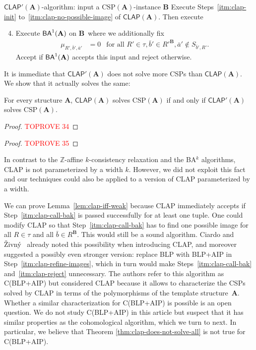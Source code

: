 \documentclass[a4paper,english, thm-restate]{lipics-v2021}
\newcommand{\ZZ}{\mathbb{Z}}
\newcommand{\tup}[1]{\bar{#1}}
\newcommand{\sig}{\tau}
\newcommand{\StructA}{\mathbf{A}}
\newcommand{\StructB}{\mathbf{B}}
\newcommand{\CSP}[1]{\mathrm{CSP}(#1)}
\newcommand{\CLAP}[1]{\mathsf{CLAP}(#1)}
\newcommand{\CLAPw}[1]{\mathsf{CLAP'}(#1)}
\begin{document}
	\begin{algobox}[top=0.4em]{$\CLAPw{\StructA}$-algorithm: input a $\CSP{\StructA}$-instance $\StructB$}
		Execute Steps~\ref{itm:clap-init} to~\ref{itm:clap-no-possible-image} of $\CLAP{\StructA}$. Then execute
		\begin{enumerate}[label=\arabic*$'$.,ref=\arabic*$'$]
			\setcounter{enumi}{3}
			\item Execute $\BAk{1}{\StructA}$ on $\StructB$\, where we additionally fix
			\begin{align*}
				\mu_{R',\tup{b}',\tup{a}'}& = 0 &\text{for all } R' \in \sig, \tup{b}' \in R'^\StructB, \tup{a}' \not\in S_{\tup{b}',R'}.
			\end{align*}
			Accept if $\BAk{1}{\StructA}$ accepts this input and reject otherwise.\label{itm:clap'-call-bak}
		\end{enumerate}
	\end{algobox}
	\noindent It is immediate that $\CLAPw{\StructA}$ does not solve more CSPs than $\CLAP{\StructA}$.
	We show that it actually solves the same:
	
	\begin{lemma}
		\label{lem:clap-iff-weak}
		For every structure $\StructA$,
		$\CLAP{\StructA}$ solves $\CSP{\StructA}$ if and only if $\CLAPw{\StructA}$ solves $\CSP{\StructA}$.
	\end{lemma}
	\begin{proof}\textcolor{red}{TOPROVE 34}\end{proof}
	
	\clapDoesNotSolveAll*
	\begin{proof}\textcolor{red}{TOPROVE 35}\end{proof}	
	
	\noindent In contrast to the $\ZZ$-affine $k$-consistency relaxation and the BA$^k$ algorithms,
	CLAP is not parameterized by a width $k$.
	However, we did not exploit this fact and our techniques could also be applied to a version of CLAP parameterized by a width.
	
	We can prove Lemma~\ref{lem:clap-iff-weak} because CLAP immediately accepts
	if Step~\ref{itm:clap-call-bak} is passed successfully for at least one tuple.
	One could modify CLAP so that Step~\ref{itm:clap-call-bak} has to find one possible image for all $R\in\sig$ and all $\tup{b}\in R^\StructB$. This would still be a sound algorithm.
	Ciardo and Živný~\cite{CiardoZivny2023CLAP} already noted this possibility
	when introducing CLAP, and moreover suggested a possibly even stronger version:
	replace BLP with BLP+AIP in Step~\ref{itm:clap-refine-images},
	which in turn would make Steps~\ref{itm:clap-call-bak} and~\ref{itm:clap-reject} unnecessary.
	The authors refer to this algorithm as C(BLP+AIP)
	but considered CLAP because it allows  to characterize
	the CSPs solved by CLAP in terms
	of the polymorphisms of the template structure~$\StructA$.
	Whether a similar characterization for C(BLP+AIP) is possible is an open question.
	We do not study C(BLP+AIP) in this article but suspect that it has similar properties as the cohomological algorithm, which we turn to next.
	In particular, we believe that Theorem \ref{thm:clap-does-not-solve-all} is not true for C(BLP+AIP).
	
\end{document}
